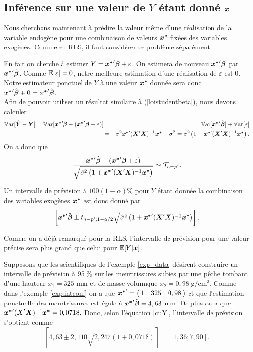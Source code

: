 \subsection{Inférence sur une valeur de $Y$ étant donné $\bo{x}$}
\label{sec:previsionRLM2}


Nous cherchons maintenant à prédire la valeur même d'une
réalisation de la variable endog\`ene pour une combinaison de
valeurs $\bo{x^*}$ fixées des variables exog\`enes. Comme en RLS, il faut considérer ce problème séparément.

En fait on cherche à estimer $Y=\bo{x^*}'\bobeta+\varepsilon$. On estimera de nouveau
$\bo{x^*}'\bobeta$ par $\bo{x^*}'\hbobeta$. Comme
$\esp[\varepsilon]=0$, notre meilleure estimation d'une réalisation de
$\varepsilon$ est $0$. Notre estimateur ponctuel de $Y$ à une
valeur $\bo{x^*}$ donnée sera donc
$\bo{x^*}'\hbobeta+0=\bo{x^*}'\hbobeta$. \\

Afin de pouvoir utiliser
un résultat similaire à (\ref{loistudentbeta}), nous devons calculer
\begin{eqnarray*}
\var[\hat{\bo Y}-\boY]=\var[\bo{x^*}'\hbobeta-(\bo{x^*}'\bobeta+\varepsilon)]&=&
\var[\bo{x^*}'\hbobeta]+\var[\varepsilon]\\
&=&\sigma^2\bo{x^*}'(\boX'\boX)^{-1}\bo{x^*}+\sigma^2=\sigma^2\left(
1+\bo{x^*}'(\boX'\boX)^{-1}\bo{x^*}\right).
\end{eqnarray*}
On a donc que
\begin{equation}\label{pivot:Y}
{\bo{x^*}'\hbobeta-(\bo{x^*}'\bobeta+\varepsilon)\over
\sqrt{\hat{\sigma}^2\left(1+\bo{x^*}'(\boX'\boX)^{-1}\bo{x^*}\right)}}\sim
\mathcal{T}_{n-p'}.
\end{equation}

Un intervalle de prévision \`a $100(1-\alpha)\%$ pour $Y$ étant
donnée la combinaison des variables exog\`enes $\bo{x^*}$ est donc
donné par
\begin{equation}\label{ci:Y}
\left[\bo{x^*}'\hbobeta\pm
t_{n-p';1-\alpha/2}\sqrt{\hat{\sigma}^2\left(1+\bo{x^*}'(\boX'\boX)^{-1}\bo{x^*}\right)}\right].
\end{equation}

Comme on a déjà remarqué pour la RLS, l'intervalle de prévision pour une valeur précise sera plus grand que celui pour $\esp[Y|\bo{x}]$.\\

\begin{exemple}
Supposons que les scientifiques de l'exemple \ref{exp_data} désirent construire un intervalle de prévision à 95 $\%$ sur les meurtrissures subies par une pêche tombant d'une hauteur  $x_1=325$ mm et de masse volumique $x_2=0,98$ g/cm$^3$. Comme dans l'exemple \ref{exp:intconf} on a que $\bo{x^*}'=\left(\!\!
\begin{array}{ccc}
1 & 325 &  0,98
\end{array}
\!\!\right)$
et que l'estimation ponctuelle des meurtrissures est égale à
$\bo{x^*}'\hbobeta=4,63$ mm. De plus on a que $\bo{x^*}'(\boX'\boX)^{-1}\bo{x^*}=0,0718.$ Donc, selon l'équation \eqref{ci:Y}, l'intervalle de prévision s'obtient comme
$$\left[4,63\pm 2,110\sqrt{2,247(1+0,0718)}\right]=\left[1,36;7,90\right].$$
\end{exemple}



